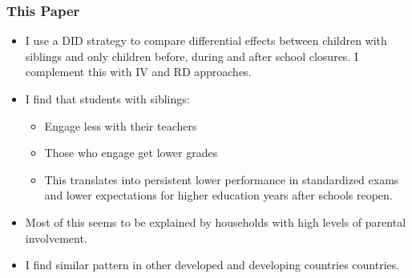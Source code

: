 \documentclass{beamer}
\newenvironment{transitionframe}{
  \setbeamercolor{background canvas}{bg=sagegreen}
  \begin{frame}}{
    \end{frame}
}
\begin{document}

\begin{frame}
    \label{frame:thispaper}
    \frametitle{This Paper}
    \begin{itemize}
    \item I use a DID strategy to compare differential effects between children with siblings and only children before, during and after school closures. I complement this with IV and RD approaches.
    \item I find that students with siblings:
    \begin{itemize}
        \item Engage less with their teachers
        \item Those who engage get lower grades
        \item This translates into persistent lower performance in standardized exams and lower expectations for higher education years after schools reopen.
    \end{itemize}
    \item Most of this seems to be explained by households with high levels of parental involvement. %
    \item I find similar pattern in other developed and developing countries countries.
    \end{itemize}
\end{frame}
\end{document}
